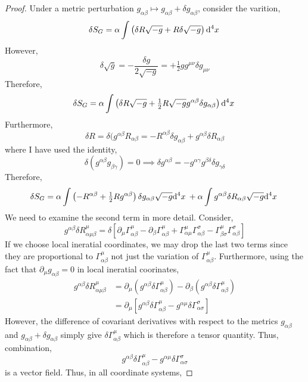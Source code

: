 \documentclass[11pt, a4paper]{article}
\begin{document}
\begin{proof}
Under a metric perturbation $g_{\alpha \beta} \mapsto
 g_{\alpha \beta} + \delta g_{\alpha \beta}$, consider the varition,
\[ \delta S_G = \alpha \int \left( \delta R \sqrt{-g} + R \delta \sqrt{-g} \right) \mathrm{d}^{4} x \: \]
However,
\[ \delta \sqrt{g} = - \frac{\delta g}{2 \sqrt{- g}} = + \tfrac{1}{2} g g^{\mu \nu} \delta g_{\mu \nu} \]
Therefore,
\[ \delta S_G = \alpha \int \left( \delta R \sqrt{-g} + \tfrac{1}{2} R \sqrt{-g} g^{\alpha \beta} \delta g_{\alpha \beta} \right) \mathrm{d}^{4} x \: \]
Furthermore,
\[ \delta R = \delta (g^{\alpha \beta} R_{\alpha \beta} = -  R^{\alpha \beta} \delta g_{\alpha \beta} + g^{\alpha \beta} \delta R_{\alpha \beta} \]
where I have used the identity,
\[ \delta (g^{\alpha \beta} g_{\beta \gamma}) = 0 \implies \delta g^{\alpha \beta} = - g^{\alpha \gamma} g^{\beta \delta} \delta g_{\gamma \delta} \]
Therefore,
\[ \delta S_G = \alpha \int \left( - R^{\alpha \beta} + \tfrac{1}{2} R g^{\alpha \beta} \right) \delta g_{\alpha \beta} \sqrt{-g} \mathrm{d}^{4} x \: + \alpha \int g^{\alpha \beta} \delta R_{\alpha \beta} \sqrt{-g} \mathrm{d}^{4} x \: \]
We need to examine the second term in more detail. Consider,
\[ g^{\alpha \beta} \delta R^\mu_{\alpha \mu \beta} = \delta \left[ \partial_\mu \Gamma^\mu_{\alpha \beta} - \partial_\beta \Gamma^\mu_{\alpha \beta} + \Gamma^\mu_{\alpha \mu} \Gamma^\sigma_{\alpha \beta} - \Gamma^\mu_{\beta \sigma} \Gamma^\sigma_{\alpha \beta} \right] \]
If we choose local ineratial coordinates, we may drop the last two terms since they are proportional to $\Gamma^\mu_{\alpha \beta}$ not just the variation of $\Gamma^\mu_{\alpha \beta}$. Furthermore, using the fact that $\partial_\mu g_{\alpha \beta} = 0$ in local ineratial coorinates,
\begin{align*}
g^{\alpha \beta} \delta R^\mu_{\alpha \mu \beta} & = \partial_\mu \left(g^{\alpha \beta} \delta \Gamma^\mu_{\alpha \beta} \right) - \partial_\beta \left( g^{\alpha \beta} \delta \Gamma^\mu_{\alpha \beta} \right)  
\\
& = \partial_\mu \left[ g^{\alpha \beta} \delta \Gamma^\mu_{\alpha \beta} - g^{\alpha \mu} \delta \Gamma^\sigma_{\alpha \sigma} \right] 
\end{align*}
However, the difference of covariant derivatives with respect to the metrics $g_{\alpha \beta}$ and $g_{\alpha \beta} + \delta g_{\alpha \beta}$ simply give $\delta \Gamma^\mu_{\alpha \beta}$ which is therefore a tensor quantity. Thus, combination,
\[ g^{\alpha \beta} \delta \Gamma^\mu_{\alpha \beta} - g^{\alpha \mu} \delta \Gamma^\sigma_{\alpha \sigma} \]
is a vector field. Thus, in all coordinate systems,

\end{proof}
\end{document}
